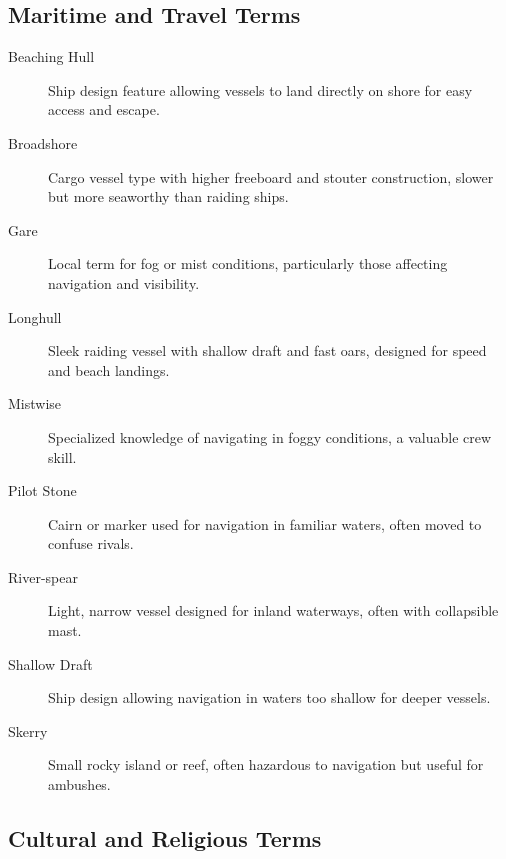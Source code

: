 \documentclass[11pt]{article}
\begin{document}
\subsection{Maritime and Travel Terms}

\begin{description}
    \item[Beaching Hull] Ship design feature allowing vessels to land directly on shore for easy access and escape.
    
    \item[Broadshore] Cargo vessel type with higher freeboard and stouter construction, slower but more seaworthy than raiding ships.
    
    \item[Gare] Local term for fog or mist conditions, particularly those affecting navigation and visibility.
    
    \item[Longhull] Sleek raiding vessel with shallow draft and fast oars, designed for speed and beach landings.
    
    \item[Mistwise] Specialized knowledge of navigating in foggy conditions, a valuable crew skill.
    
    \item[Pilot Stone] Cairn or marker used for navigation in familiar waters, often moved to confuse rivals.
    
    \item[River-spear] Light, narrow vessel designed for inland waterways, often with collapsible mast.
    
    \item[Shallow Draft] Ship design allowing navigation in waters too shallow for deeper vessels.
    
    \item[Skerry] Small rocky island or reef, often hazardous to navigation but useful for ambushes.
\end{description}

\subsection{Cultural and Religious Terms}
\end{document}

